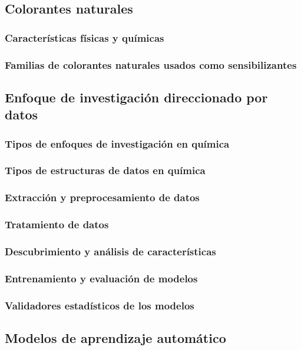 \documentclass{article}
\theoremstyle{mytheoremstyle}
\theoremstyle{mytheoremstyle}
\theoremstyle{myproblemstyle}
\begin{document}
    \subsection{Colorantes naturales}

    \subsubsection{Características físicas y químicas}
    \subsubsection{Familias de colorantes naturales usados como sensibilizantes}

    \subsection{Enfoque de investigación direccionado por datos}

    \subsubsection{Tipos de enfoques de investigación en química}
    \subsubsection{Tipos de estructuras de datos en química}
    \subsubsection{Extracción y preprocesamiento de datos}
    \subsubsection{Tratamiento de datos}
    \subsubsection{Descubrimiento y análisis de características}
    \subsubsection{Entrenamiento y evaluación de modelos}
    \subsubsection{Validadores estadísticos de los modelos}
    

    \subsection{Modelos de aprendizaje automático}
\end{document}
